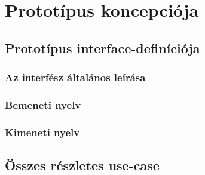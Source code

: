 

\usepackage{enumitem}



\fedlap

\addtocounter{section}{6}
\section{Prototípus koncepciója}

	\subsection{Prototípus interface-definíciója}
	    \subsubsection{Az interfész általános leírása}
	    \subsubsection{Bemeneti nyelv}
	    \subsubsection{Kimeneti nyelv}	
	
	\subsection{Összes részletes use-case}
        \newcommand{\ucitem}[1]{\item \textbf{Név: #1}\\}
        \newcommand{\ucdesc}[1]{\textbf{Leírás: } #1\\}
        \newcommand{\ucscenario}[1]{\textbf{Forgatókönyv: }#1\\}
        
